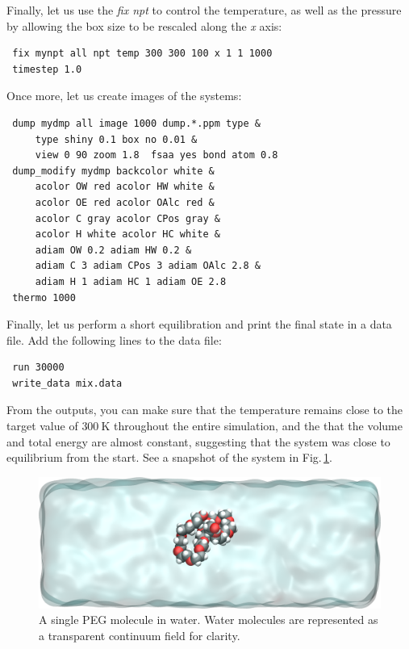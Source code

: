 \documentclass[9pt,tutorial]{livecoms}
\begin{document}
Finally, let us use the \textit{fix npt} to control the temperature, as
well as the pressure by allowing the box size to be rescaled along the \textit{x} axis:
{\normalsize \begin{verbatim}
 fix mynpt all npt temp 300 300 100 x 1 1 1000
 timestep 1.0
\end{verbatim}}
Once more, let us create images of the systems:
{\normalsize \begin{verbatim}
 dump mydmp all image 1000 dump.*.ppm type &
     type shiny 0.1 box no 0.01 &
     view 0 90 zoom 1.8  fsaa yes bond atom 0.8
 dump_modify mydmp backcolor white &
     acolor OW red acolor HW white &
     acolor OE red acolor OAlc red &
     acolor C gray acolor CPos gray &
     acolor H white acolor HC white &
     adiam OW 0.2 adiam HW 0.2 &
     adiam C 3 adiam CPos 3 adiam OAlc 2.8 &
     adiam H 1 adiam HC 1 adiam OE 2.8
 thermo 1000
\end{verbatim}}
Finally, let us perform a short equilibration and print the
final state in a data file. Add the following lines to the data file:
{\normalsize \begin{verbatim}
 run 30000
 write_data mix.data
\end{verbatim}}
From the outputs, you can make sure that the temperature remains close to the
target value of $300~\text{K}$ throughout the entire simulation, and the that
the volume and total energy are almost constant, suggesting
that the system was close to equilibrium from the start. See a snapshot of the
system in Fig.\,\ref{fig:PEG-solvated}.

\begin{figure}
\centering
\includegraphics[width=\linewidth]{PEG-solvated}
\caption{A single PEG molecule in water. Water molecules are represented as a
transparent continuum field for clarity.}
\label{fig:PEG-solvated}
\end{figure}
\end{document}

